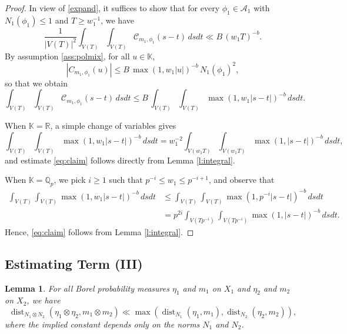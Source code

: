 \documentclass[11pt,reqno,a4paper]{amsart}
\numberwithin{equation}{section}
\newcommand{\cA}{\mathcal{A}}
\newcommand{\cC}{\mathcal{C}}
\newcommand{\bK}{\mathbb{K}}
\newcommand{\bQ}{\mathbb{Q}}
\newcommand{\bR}{\mathbb{R}}
\DeclareMathOperator{\dist}{dist}
\theoremstyle{theorem}
\newtheorem{lemma}[theorem]{Lemma}
\theoremstyle{definition}
\begin{document}
\begin{proof}
In view of \eqref{expand}, it suffices to show that for every $\phi_1 \in \cA_1$ with $N_1(\phi_1) \leq 1$ and $T\ge w_1^{-1}$,
we have
\begin{equation}
\label{eq:claim}
\frac{1}{|V(T)|^2} \int_{V(T)} \int_{V(T)}\cC_{m_1,\phi_1}(s-t) \, ds dt \ll B\, (w_1 T)^{-b}.
\end{equation}
By assumption \eqref{ass:polmix}, for all $u\in \mathbb{K}$,
$$
|C_{m_1,\phi_1}(u)|\le B\, \max(1,w_1|u|)^{-b}\, N_1(\phi_1)^2,
$$
so that we obtain
\[
\int_{V(T)} \int_{V(T)}\cC_{m_1,\phi_1}(s-t) \, ds dt
\le
B\, \int_{V(T)} \int_{V(T)}\max(1,w_1 |s-t|)^{-b} \, dsdt.
\]

When $\bK=\bR$, a simple change of variables gives
$$
\int_{V(T)} \int_{V(T)}\max(1,w_1 |s-t|)^{-b} \, dsdt
=w_1^{-2}\int_{V(w_1T)} \int_{V(w_1T)}\max(1,|s-t|)^{-b} \, dsdt,
$$
and estimate \eqref{eq:claim} follows directly from Lemma \ref{l:integral}.

When $\bK=\bQ_p$, we pick $i\ge 1$ such that $p^{-i}\le w_1 \le p^{-i+1}$, and observe that
\begin{align*}
\int_{V(T)} \int_{V(T)}\max(1,w_1 |s-t|)^{-b} \, dsdt
&\le
\int_{V(T)} \int_{V(T)}\max(1,p^{-i} |s-t|)^{-b} \, dsdt\\
&=p^{2i}\int_{V(Tp^{-i})} \int_{V(Tp^{-i})}\max(1,|s-t|)^{-b} \, dsdt.
\end{align*}
Hence, \eqref{eq:claim} follows from Lemma \ref{l:integral}.
\end{proof}

\subsection{Estimating Term (III)} 

\begin{lemma}
\label{lemmaIII}
For all Borel probability measures $\eta_1$ and $m_1$ on $X_1$ and $\eta_2$ and $m_2$ on $X_2$,
we have 
\[
\dist_{N_1 \otimes N_2}(\eta_1 \otimes \eta_2,m_1 \otimes m_2)
\ll 
\max(\dist_{N_1}(\eta_1,m_1), \dist_{N_2}(\eta_2,m_2)),
\]
where the implied constant depends only on the norms $N_1$ and $N_2$.
\end{lemma}
\end{document}
